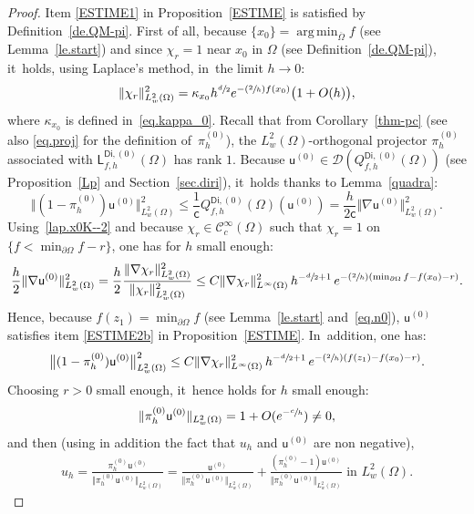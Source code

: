 \documentclass[10pt]{amsart}
\newcommand{\Psfrac}[2]{(\sfrac{#1}{#2})}
\DeclareMathOperator*{\argmin}{arg\,min}
\theoremstyle{plain}
\theoremstyle{definition}
\begin{document}
\begin{proof} Item \eqref{ESTIME1} in Proposition~\ref{ESTIME} is satisfied by Definition~\ref{de.QM-pi}.
First of all, because $\{x_0\}= \argmin_{\overline \Omega} f$ (see Lemma~\ref{le.start}) and since $\chi_r=1$ near $x_0$ in $\Omega$ (see Definition~\ref{de.QM-pi}), it~holds, using Laplace's method, in~the limit $h\to 0$:
\begin{equation}\label{lap.x0K--2}
\Vert \chi_r\Vert_{L^2_w(\Omega)}^2= \kappa_{x_0} h^{\sfrac d2} e^{-\Psfrac 2h f(x_0)} \bigl(1+O(h)\bigr),
\end{equation}
where $\kappa_{x_0}$ is defined in~\eqref{eq.kappa_0}.
Recall that from Corollary~\ref{thm-pc} (see also \eqref{eq.proj} for the definition of~$ \pi_h^{(0)}$), the $L^2_w(\Omega)$-orthogonal projector $ \pi_h^{(0)}$ associated with $\mathsf L_{f,h}^{\mathsf{Di},(0)}(\Omega)$ has rank $1$.
Because $\mathsf u^{(0)}\in \mathcal D(Q_{f,h}^{\mathsf{Di},(0)}(\Omega))$ (see Proposition~\ref{Lp} and Section~\ref{sec.diri}), it~holds thanks to Lemma~\ref{quadra}:
\[
\big \Vert(1- \pi_h^{(0)}) \mathsf u^{(0)} \big \Vert_{L^2_w(\Omega)}^2 \le\frac{1}{\mathsf c}Q_{f,h}^{\mathsf{Di},(0)}(\Omega)(\mathsf u^{(0)})= \frac {h}{2\mathsf c} \Vert \nabla \mathsf u^{(0)} \Vert_{L^2_w(\Omega)}^2.
\]
Using~\eqref{lap.x0K--2} and because $\chi_r\in \mathcal C^\infty_c(\Omega)$ such that $\chi_r=1$ on $\{f<\min_{\partial \Omega}f-r\}$, one has for $h$ small enough:
\[
\frac h2 \Vert \nabla \mathsf u^{(0)} \Vert_{L^2_w(\Omega)}^2 = \frac h2\frac{\Vert \nabla \chi_r\Vert_{L^2_w(\Omega)}^2}{\Vert \chi_r\Vert_{L^2_w(\Omega)}^2}
\le C \Vert \nabla \chi_r \Vert_{L^\infty(\Omega)}^2 \, h^{-\sfrac d2+ 1}\, e^{-\Psfrac{2}{h} (\min_{\partial \Omega}f -f(x_0)-r)}.
\]
Hence, because $f(z_1)=\min_{\partial \Omega}f$ (see Lemma~\ref{le.start} and~\eqref{eq.n0}), $\mathsf u^{(0)}$ satisfies item \eqref{ESTIME2b} in Proposition~\ref{ESTIME}. In~addition, one has:
\[
\big \Vert(1- \pi_h^{(0)}) \mathsf u^{(0)} \big \Vert_{L^2_w(\Omega)}^2 \le C \Vert \nabla \chi_r \Vert_{L^\infty(\Omega)}^2 \, h^{-\sfrac d2+ 1}\, e^{-\Psfrac{2}{h} (f(z_1) -f(x_0)-r)}.
\]
Choosing $r>0$ small enough, it~hence holds for $h$ small enough:\vspace*{-3pt}
\[
\Vert \pi_h^{(0)}\mathsf u^{(0)} \Vert_{L^2_w(\Omega)}=1+O(e^{-\sfrac ch}) \neq 0,
\]
and then (using in addition the fact that $u_h$ and $\mathsf
u^{(0)}$ are non negative),\vspace*{-3pt}
\begin{align*}
u_{h}=\frac{\pi_h^{(0)}\mathsf u^{(0)} }{ \Vert \pi_h^{(0)}\mathsf u^{(0)} \Vert_{L^2_w(\Omega)} }= \frac{\mathsf u^{(0)}}{ \Vert \pi_h^{(0)}\mathsf u^{(0)} \Vert_{L^2_w(\Omega)}} + \frac{(\pi_h^{(0)} -1)\mathsf u^{(0)} }{ \Vert \pi_h^{(0)}\mathsf u^{(0)} \Vert_{L^2_w(\Omega)}} \text{ in } L^2_w(\Omega).

\end{align*}
\end{proof}
\end{document}
